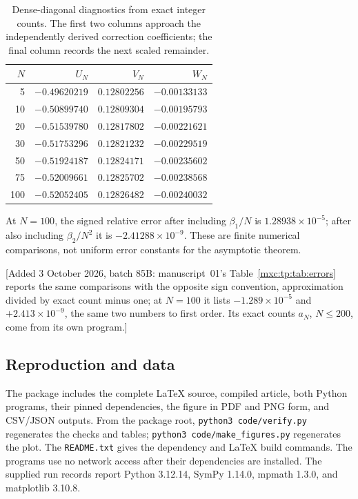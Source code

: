 \documentclass[11pt]{article}
\numberwithin{equation}{section}
\theoremstyle{definition}
\theoremstyle{remark}
\begin{document}
\begin{table}[htbp]
\centering\small
\begin{tabular}{@{}rrrr@{}}
\toprule
$N$ & $U_N$ & $V_N$ & $W_N$\\
\midrule
5   & $-0.49620219$ & $0.12802256$ & $-0.00133133$\\
10  & $-0.50899740$ & $0.12809304$ & $-0.00195793$\\
20  & $-0.51539780$ & $0.12817802$ & $-0.00221621$\\
30  & $-0.51753296$ & $0.12821232$ & $-0.00229519$\\
50  & $-0.51924187$ & $0.12824171$ & $-0.00235602$\\
75  & $-0.52009661$ & $0.12825702$ & $-0.00238568$\\
100 & $-0.52052405$ & $0.12826482$ & $-0.00240032$\\
\bottomrule
\end{tabular}
\caption{Dense-diagonal diagnostics from exact integer counts. The
first two columns approach the independently derived correction
coefficients; the final column records the next scaled remainder.}
\label{mxc:tab:numeric-diagonal}
\end{table}

At $N=100$, the signed relative error after including $\beta_1/N$
is $1.28938\times10^{-5}$; after also including $\beta_2/N^2$ it is
$-2.41288\times10^{-9}$. These are finite numerical comparisons,
not uniform error constants for the asymptotic theorem.

[Added 3 October 2026, batch 85B: manuscript~01's
Table~\ref{mxc:tp:tab:errors} reports the same comparisons with the
opposite sign convention, approximation divided by exact count minus one;
at $N=100$ it lists $-1.289\times10^{-5}$ and $+2.413\times10^{-9}$, the
same two numbers to first order. Its exact counts $a_N$, $N\le200$, come
from its own program.]

\subsection{Reproduction and data}
The package includes the complete \LaTeX{} source, compiled article,
both Python programs, their pinned dependencies, the figure in PDF
and PNG form, and CSV/JSON outputs. From the package root,
\texttt{python3 code/verify.py} regenerates the checks and tables;
\texttt{python3 code/make\_figures.py} regenerates the plot. The
\texttt{README.txt} gives the dependency and \LaTeX{} build commands.
The programs use no network access after their dependencies are
installed. The supplied run records report Python 3.12.14,
SymPy 1.14.0, mpmath 1.3.0, and matplotlib 3.10.8.
\end{document}
